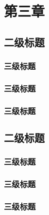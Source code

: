 \chapter{第三章} \label{cht:d2unet}

\section{二级标题}

\subsection{三级标题}

\subsection{三级标题}

\subsection{三级标题}

\section{二级标题}

\subsection{三级标题}

\subsection{三级标题}

\subsection{三级标题}